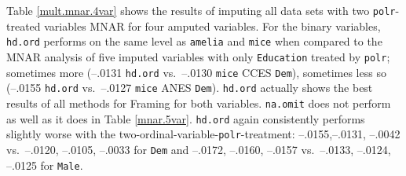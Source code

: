 \documentclass[12pt,econ]{sources/authesis}
\begin{document}
Table \ref{mult.mnar.4var} shows the results of imputing all data sets with two \texttt{polr}-treated variables MNAR for four amputed variables. For the binary variables, \texttt{hd.ord} performs on the same level as \texttt{amelia} and \texttt{mice} when compared to the MNAR analysis of five imputed variables with only \texttt{Education} treated by \texttt{polr}; sometimes more (--.0131 \texttt{hd.ord} vs.~--.0130 \texttt{mice} CCES \texttt{Dem}), sometimes less so (--.0155 \texttt{hd.ord} vs.~--.0127 \texttt{mice} ANES \texttt{Dem}). \texttt{hd.ord} actually shows the best results of all methods for Framing for both variables. \texttt{na.omit} does not perform as well as it does in Table \ref{mnar.5var}. \texttt{hd.ord} again consistently performs slightly worse with the two-ordinal-variable-\texttt{polr}-treatment: --.0155,--.0131, --.0042 vs.~--.0120, --.0105, --.0033 for \texttt{Dem} and --.0172, --.0160, --.0157 vs.~--.0133, --.0124, --.0125 for \texttt{Male}.
\end{document}
